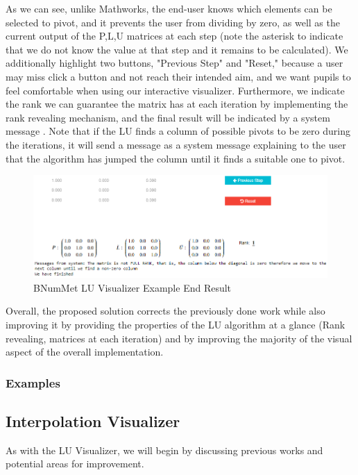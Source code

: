 As we can see, unlike Mathworks, the end-user knows which elements can be selected to pivot, and it prevents the user from dividing by zero, as well as the current output of the P,L,U matrices at each step (note the asterisk to indicate that we do not know the value at that step and it remains to be calculated). We additionally highlight two buttons, "Previous Step" and "Reset," because a user may miss click a button and not reach their intended aim, and we want pupils to feel comfortable when using our interactive visualizer.
Furthermore, we indicate the rank we can guarantee the matrix has at each iteration by implementing the rank revealing mechanism, and the final result will be indicated by a system message . Note that if the LU finds a column of possible pivots to be zero during the iterations, it will send a message as a system message explaining to the user that the algorithm has jumped the column until it finds a suitable one to pivot.

\begin{figure}[H]
    \centering
    \includegraphics[width=\textwidth]{Include/Images/Thesis/Development/Visualizers/LU VISUALIZER/BNumMet.LU.Ex1.1.png}
    \caption{BNumMet LU Visualizer Example End Result}
    \label{fig:BNumMet Example End Result}
\end{figure}

Overall, the proposed solution corrects the previously done work while also improving it by providing the properties of the LU algorithm at a glance (Rank revealing, matrices at each iteration) and by improving the majority of the visual aspect of the overall implementation.

\subsubsection{Examples}
	

\subsection{Interpolation Visualizer}
As with the LU Visualizer, we will begin by discussing previous works and potential areas for improvement.

